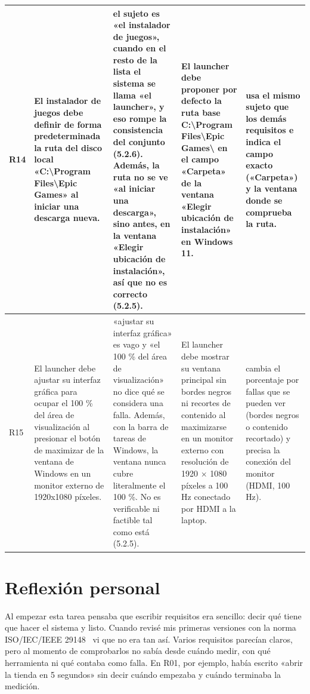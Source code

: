 \documentclass[10pt,a4paper]{article}
\begin{document}
\begin{landscape}
\begin{longtable}{|>{\raggedright\arraybackslash}p{1cm}|>{\raggedright\arraybackslash}p{5.6cm}|>{\raggedright\arraybackslash}p{5.6cm}|>{\raggedright\arraybackslash}p{7.4cm}|>{\raggedright\arraybackslash}p{5.0cm}|}
R14 & El instalador de juegos debe definir de forma predeterminada la ruta del disco local «C:\textbackslash{}Program Files\textbackslash{}Epic Games» al iniciar una descarga nueva. & el sujeto es «el instalador de juegos», cuando en el resto de la lista el sistema se llama «el launcher», y eso rompe la consistencia del conjunto (5.2.6). Además, la ruta no se ve «al iniciar una descarga», sino antes, en la ventana «Elegir ubicación de instalación», así que no es correcto (5.2.5). & El launcher debe proponer por defecto la ruta base C:\textbackslash{}Program Files\textbackslash{}Epic Games\textbackslash{} en el campo «Carpeta» de la ventana «Elegir ubicación de instalación» en Windows 11. & usa el mismo sujeto que los demás requisitos e indica el campo exacto («Carpeta») y la ventana donde se comprueba la ruta. \\ \hline
R15 & El launcher debe ajustar su interfaz gráfica para ocupar el 100 \% del área de visualización al presionar el botón de maximizar de la ventana de Windows en un monitor externo de 1920x1080 píxeles. & «ajustar su interfaz gráfica» es vago y «el 100 \% del área de visualización» no dice qué se considera una falla. Además, con la barra de tareas de Windows, la ventana nunca cubre literalmente el 100 \%. No es verificable ni factible tal como está (5.2.5). & El launcher debe mostrar su ventana principal sin bordes negros ni recortes de contenido al maximizarse en un monitor externo con resolución de 1920 $\times$ 1080 píxeles a 100 Hz conectado por HDMI a la laptop. & cambia el porcentaje por fallas que se pueden ver (bordes negros o contenido recortado) y precisa la conexión del monitor (HDMI, 100 Hz). \\ \hline
\end{longtable}
\endgroup
\end{landscape}

\section{Reflexi\'on personal}
Al empezar esta tarea pensaba que escribir requisitos era sencillo: decir qué tiene que hacer el sistema y listo. Cuando revisé mis primeras versiones con la norma ISO/IEC/IEEE 29148~\cite{iso29148} vi que no era tan así. Varios requisitos parecían claros, pero al momento de comprobarlos no sabía desde cuándo medir, con qué herramienta ni qué contaba como falla. En R01, por ejemplo, había escrito «abrir la tienda en 5 segundos» sin decir cuándo empezaba y cuándo terminaba la medición.
\end{document}
